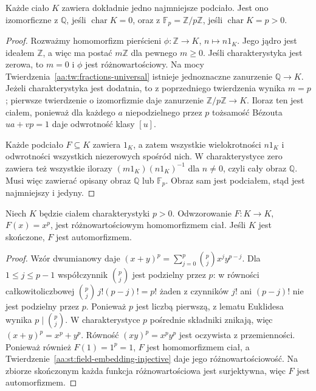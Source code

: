 \begin{twierdzenie}
\label{aa:tw:prime-subfield}
Każde ciało $K$ zawiera dokładnie jedno najmniejsze podciało.
Jest ono izomorficzne z $\mathbb Q$, jeśli
$\operatorname{char}K=0$, oraz z $\mathbb F_p=\mathbb Z/p\mathbb Z$,
jeśli $\operatorname{char}K=p>0$.
\end{twierdzenie}
\begin{proof}
Rozważmy homomorfizm pierścieni
$\phi:\mathbb Z\to K$, $n\mapsto n1_K$.
Jego jądro jest ideałem $\mathbb Z$, a więc ma
postać $m\mathbb Z$ dla pewnego $m\ge0$.
Jeśli charakterystyka jest zerowa, to $m=0$ i $\phi$
jest różnowartościowy. Na mocy
Twierdzenia~\ref{aa:tw:fractions-universal} istnieje
jednoznaczne zanurzenie $\mathbb Q\to K$.
Jeżeli charakterystyka jest dodatnia, to z poprzedniego
twierdzenia wynika $m=p$; pierwsze twierdzenie o
izomorfizmie daje zanurzenie
$\mathbb Z/p\mathbb Z\to K$. Iloraz ten jest ciałem,
ponieważ dla każdego $a$ niepodzielnego przez $p$
tożsamość Bézouta $ua+vp=1$ daje odwrotność klasy $[u]$.

Każde podciało $F\subseteq K$ zawiera $1_K$, a zatem
wszystkie wielokrotności $n1_K$ i odwrotności wszystkich
niezerowych spośród nich. W charakterystyce zero zawiera
też wszystkie ilorazy $(m1_K)(n1_K)^{-1}$ dla $n\ne0$,
czyli cały obraz $\mathbb Q$. Musi więc zawierać opisany obraz
$\mathbb Q$ lub $\mathbb F_p$. Obraz sam jest podciałem,
stąd jest najmniejszy i jedyny.
\end{proof}

\begin{twierdzenie}
\label{aa:tw:field-frobenius}
Niech $K$ będzie ciałem charakterystyki $p>0$.
Odwzorowanie $F:K\to K$, $F(x)=x^p$, jest
różnowartościowym homomorfizmem ciał. Jeśli $K$
jest skończone, $F$ jest automorfizmem.
\end{twierdzenie}
\begin{proof}
Wzór dwumianowy daje
$(x+y)^p=\sum_{j=0}^p\binom pj x^j y^{p-j}$.
Dla $1\le j\le p-1$ współczynnik $\binom pj$
jest podzielny przez $p$: w równości całkowitoliczbowej
$\binom pj\,j!(p-j)!=p!$ żaden z czynników $j!$ ani $(p-j)!$ nie jest
podzielny przez $p$.
Ponieważ $p$ jest liczbą pierwszą, z lematu Euklidesa wynika
$p\mid\binom pj$.
W charakterystyce $p$ pośrednie składniki znikają,
więc $(x+y)^p=x^p+y^p$. Równość
$(xy)^p=x^py^p$ jest oczywista z przemienności.
Ponieważ również $F(1)=1^p=1$,
$F$ jest homomorfizmem ciał, a
Twierdzenie~\ref{aa:st:field-embedding-injective}
daje jego różnowartościowość.
Na zbiorze skończonym każda funkcja różnowartościowa
jest surjektywna, więc $F$ jest automorfizmem.
\end{proof}

